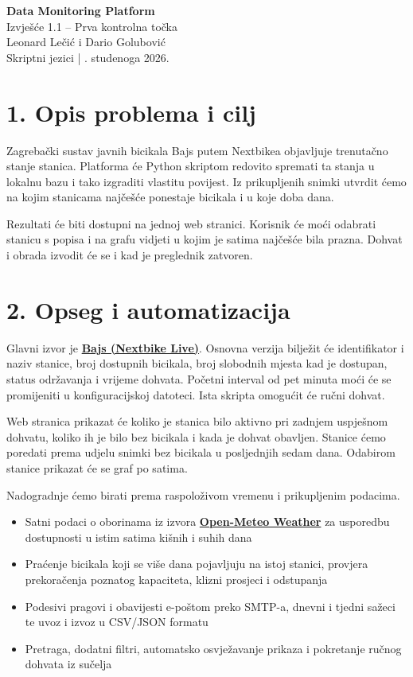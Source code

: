 \documentclass[a4paper,11pt]{article}
\begin{document}
\begin{center}
{\Large\bfseries Data Monitoring Platform}\\[5pt]
{\large Izvješće 1.1 -- Prva kontrolna točka}\\[7pt]
Leonard Lečić i Dario Golubović\\
Skriptni jezici \quad | . studenoga 2026.
\end{center}

\section*{1. Opis problema i cilj}
Zagrebački sustav javnih bicikala Bajs putem Nextbikea objavljuje
trenutačno stanje stanica. Platforma će Python skriptom redovito
spremati ta stanja u lokalnu bazu i tako izgraditi vlastitu povijest.
Iz prikupljenih snimki utvrdit ćemo na kojim stanicama najčešće
ponestaje bicikala i u koje doba dana.

Rezultati će biti dostupni na jednoj web stranici. Korisnik će moći
odabrati stanicu s popisa i na grafu vidjeti u kojim je satima
najčešće bila prazna. Dohvat i obrada izvodit će se i kad je preglednik
zatvoren.

\section*{2. Opseg i automatizacija}
Glavni izvor je \href{https://maps.nextbike.net/maps/nextbike-live.json?city=1172&domains=hd&list_cities=0&bikes=0}{\textbf{Bajs (Nextbike Live)}}.
Osnovna verzija bilježit će identifikator i naziv stanice, broj dostupnih
bicikala, broj slobodnih mjesta kad je dostupan, status održavanja i
vrijeme dohvata. Početni interval od pet minuta moći će se promijeniti
u konfiguracijskoj datoteci. Ista skripta omogućit će ručni dohvat.

Web stranica prikazat će koliko je stanica bilo aktivno pri zadnjem
uspješnom dohvatu, koliko ih je bilo bez bicikala i kada je dohvat
obavljen. Stanice ćemo poredati prema udjelu snimki bez bicikala u
posljednjih sedam dana. Odabirom stanice prikazat će se graf po satima.

Nadogradnje ćemo birati prema raspoloživom vremenu i prikupljenim
podacima.
\begin{itemize}
\item Satni podaci o oborinama iz izvora
\href{https://open-meteo.com/en/docs/historical-weather-api}{\textbf{Open-Meteo Weather}}
za usporedbu dostupnosti u istim satima kišnih i suhih dana
\item Praćenje bicikala koji se više dana pojavljuju na istoj stanici,
provjera prekoračenja poznatog kapaciteta, klizni prosjeci i odstupanja
\item Podesivi pragovi i obavijesti e-poštom preko SMTP-a, dnevni i tjedni
sažeci te uvoz i izvoz u CSV/JSON formatu
\item Pretraga, dodatni filtri, automatsko osvježavanje prikaza i
pokretanje ručnog dohvata iz sučelja
\end{itemize}
\end{document}

